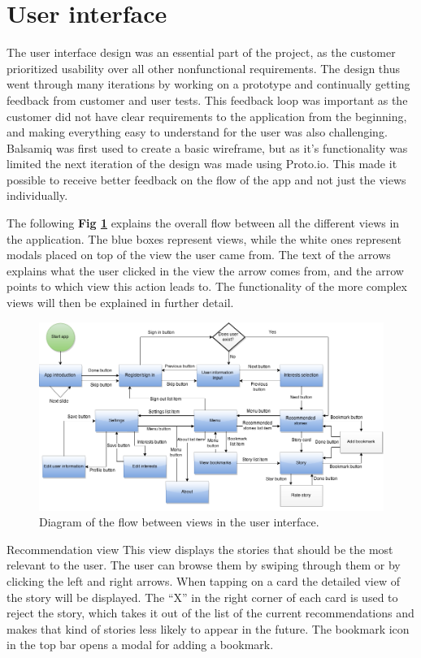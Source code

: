 \section{User interface}

The user interface design was an essential part of the project, as the customer prioritized usability over all other nonfunctional requirements. The design thus went through many iterations by working on a prototype and continually getting feedback from customer and user tests. This feedback loop was important as the customer did not have clear requirements to the application from the beginning, and making everything easy to understand for the user was also challenging.  Balsamiq was first used to create a basic wireframe, but as it’s functionality was limited the next iteration of the design was made using Proto.io. This made it possible to receive better feedback on the flow of the app and not just the views individually. \newline

The following \textbf{Fig \ref{flow_diagram}} explains the overall flow between all the different views in the application. The blue boxes represent views, while the white ones represent modals placed on top of the view the user came from. The text of the arrows explains what the user clicked in the view the arrow comes from, and the arrow points to which view this action leads to.  The functionality of the more complex views will then be explained in further detail.

\begin{figure}[h!]
	\centering
	\includegraphics[width=\textwidth]{fig/flow_diagram}
	\caption{Diagram of the flow between views in the user interface.}
	\label{flow_diagram}
\end{figure}


Recommendation view\newline
This view displays the stories that should be the most relevant to the user. The user can browse them by swiping through them or by clicking the left and right arrows. When tapping on a card the detailed view of the story will be displayed. The “X” in the right corner of each card is used to reject the story, which takes it out of the list of the current recommendations and makes that kind of stories less likely to appear in the future. The bookmark icon in the top bar opens a modal for adding a bookmark. 


